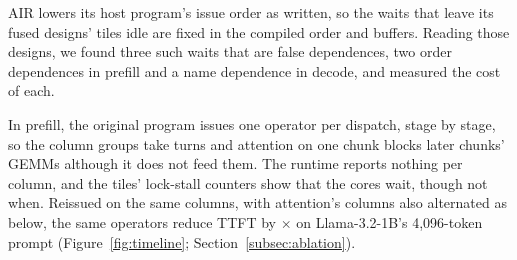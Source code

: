 AIR lowers its host program's issue order as written, so the waits that leave its fused designs' tiles idle are fixed in the compiled order and buffers.
Reading those designs, we found three such waits that are false dependences, two order dependences in prefill and a name dependence in decode, and measured the cost of each.

In prefill, the original program issues one operator per dispatch, stage by stage, so the column groups take turns and attention on one chunk blocks later chunks' GEMMs although it does not feed them.
The runtime reports nothing per column, and the tiles' lock-stall counters show that the cores wait, though not when.
Reissued on the same columns, with attention's columns also alternated as below, the same operators reduce TTFT by \FigOneGain$\times$ on Llama-3.2-1B's 4{,}096-token prompt (Figure~\ref{fig:timeline}; Section~\ref{subsec:ablation}).

